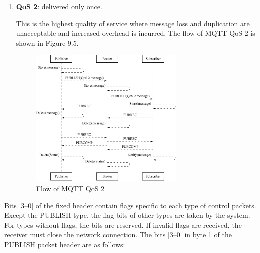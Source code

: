 \documentclass[a4paper,12pt,openany]{book}
\begin{document}
\begin{enumerate}[label=\alph*.,leftmargin=1.5em]
    \item \textbf{QoS 2}: delivered only once.
    
    This is the highest quality of service where message loss and duplication are unacceptable and increased overhead is incurred. The flow of MQTT QoS 2 is shown in Figure 9.5.

    \begin{figure}[!h]
        \centering
        \includegraphics[width=0.7\textwidth]{D9Z/9-5}
        \caption{Flow of MQTT QoS 2}
    \end{figure}
\end{enumerate}

Bits [3–0] of the fixed header contain flags specific to each type of control packets. Except the PUBLISH type, the flag bits of other types are taken by the system. For types without flags, the bits are reserved. If invalid flags are received, the receiver must close the network connection. The bits [3–0] in byte 1 of the PUBLISH packet header are as follows:
\end{document}
